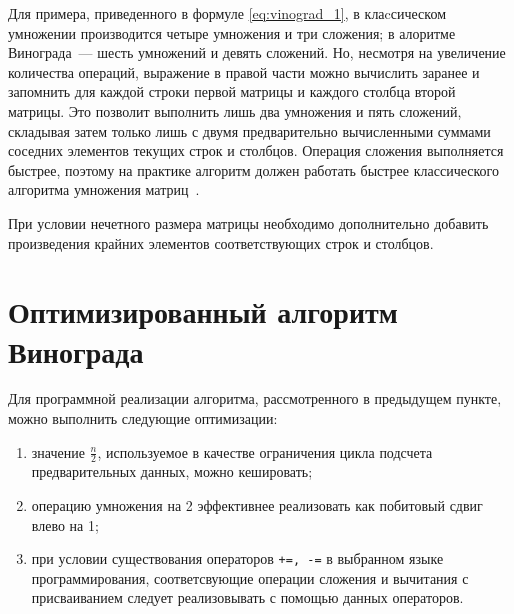 Для примера, приведенного в формуле \ref{eq:vinograd_1}, в клаcсическом умножении производится четыре умножения и три сложения; в алоритме Винограда~--- шесть умножений и девять сложений. Но, несмотря на увеличение количества операций, выражение в правой части можно вычислить заранее и запомнить для каждой строки первой матрицы и каждого столбца второй матрицы.
Это позволит выполнить лишь два умножения и пять сложений, складывая затем только лишь с двумя предварительно вычисленными суммами соседних элементов текущих строк и столбцов. Операция сложения выполняется быстрее, поэтому на практике алгоритм должен работать быстрее классического алгоритма умножения матриц~\cite{vinograd-alg}.

При условии нечетного размера матрицы необходимо дополнительно добавить произведения крайних элементов соответствующих строк и столбцов.

\section{Оптимизированный алгоритм Винограда}
Для программной реализации алгоритма, рассмотренного в предыдущем пункте, можно выполнить следующие оптимизации:
\begin{enumerate}
    \item значение $\frac{n}{2}$, используемое в качестве ограничения цикла подсчета предварительных данных, можно кешировать;
    \item операцию умножения на 2 эффективнее реализовать как побитовый сдвиг влево на 1;
    \item при условии существования операторов \texttt{+=, -=} в выбранном языке программирования, соответсвующие операции сложения и вычитания с присваиванием следует реализовывать с помощью данных операторов.
\end{enumerate}

